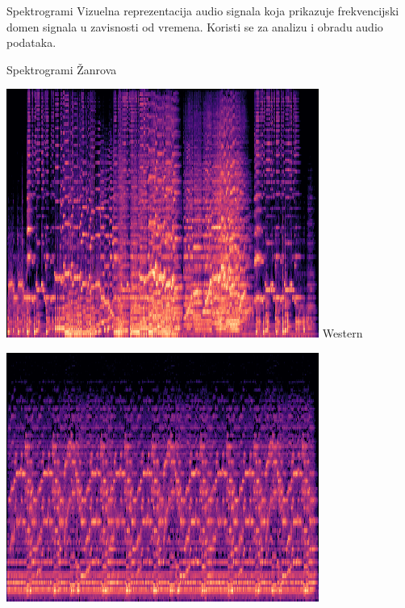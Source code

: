 \documentclass{beamer}
\begin{document}
\begin{frame}{Spektrogrami}
Vizuelna reprezentacija audio signala koja prikazuje frekvencijski domen signala u zavisnosti od vremena. Koristi se za analizu i obradu audio podataka.

\end{frame}

\begin{frame}{Spektrogrami Žanrova}
\centering

\begin{minipage}{0.3\linewidth}
  \includegraphics[width=\linewidth]{slike/western06.png}
	Western
\end{minipage}%
\begin{minipage}{0.3\linewidth}
  \includegraphics[width=\linewidth]{slike/scifi48.png}

\end{minipage}
\end{frame}
\end{document}
